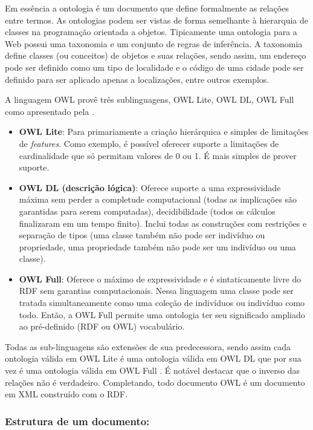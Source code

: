 Em essência a ontologia é um documento que define formalmente as relações entre termos. As ontologias podem ser vistas de forma semelhante à hierarquia de classes na programação orientada a objetos. Tipicamente uma ontologia para a Web possui uma taxonomia e um conjunto de regras de inferência. A taxonomia define classes (ou conceitos) de objetos e suas relações, sendo assim, um endereço pode ser definido como um tipo de localidade e o código de uma cidade pode ser definido para ser aplicado apenas a localizações, entre outros exemplos.

A linguagem OWL provê três sublinguagens, OWL Lite, OWL DL, OWL Full como apresentado pela \cite{OWLW3C}.

\begin{itemize}
	\item{\textbf{OWL Lite}: Para primariamente a criação hierárquica e simples de limitações de \textit{features}. Como exemplo, é possível oferecer suporte a limitações de cardinalidade que só permitam valores de 0 ou 1. É mais simples de prover suporte.} 

	\item{\textbf{OWL DL (descrição lógica)}: Oferece suporte a uma expressividade máxima sem perder a completude computacional (todas as implicações são garantidas para serem computadas), decidibilidade (todos os cálculos finalizaram em um tempo finito). Inclui todas as construções com restrições e separação de tipos (uma classe também não pode ser indivíduo ou propriedade, uma propriedade também não pode ser um indivíduo ou uma classe).}

	\item{\textbf{OWL Full}: Oferece o máximo de expressividade e é sintaticamente livre do RDF sem garantias computacionais. Nessa linguagem uma classe pode ser tratada simultaneamente como uma coleção de indivíduos ou indivíduo como todo. Então, a OWL Full permite uma ontologia ter seu significado ampliado ao pré-definido (RDF ou OWL) vocabulário.}
\end{itemize}

Todas as sub-linguagens são extensões de sua predecessora, sendo assim cada ontologia válida em OWL Lite é uma ontologia válida em OWL DL que por sua vez é uma ontologia válida em OWL Full \citep{OWLW3C}. É notável destacar que o inverso das relações não é verdadeiro. Completando, todo documento OWL é um documento em XML construído com o RDF.

\subsubsection{Estrutura de um documento:}


